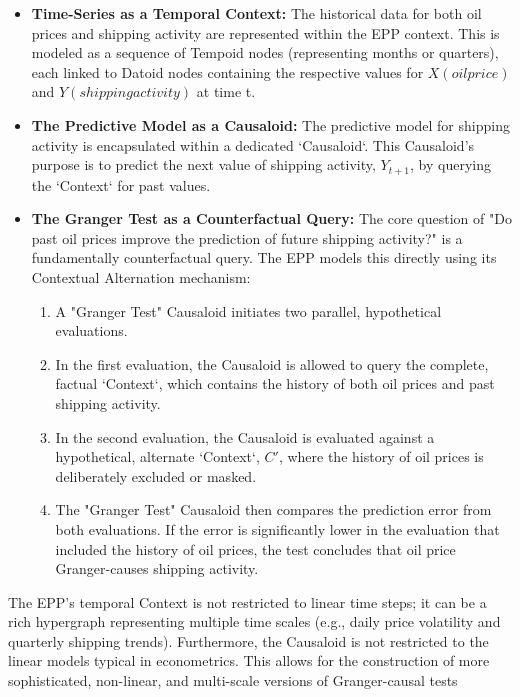 \begin{itemize}
	\item \textbf{Time-Series as a Temporal Context:} The historical data for both oil prices and shipping activity are represented within the EPP context. This is modeled as a sequence of Tempoid nodes (representing months or quarters), each linked to Datoid nodes containing the respective values for $X(oil price)$ and $Y(shipping activity)$ at time t.

	\item \textbf{The Predictive Model as a Causaloid:} The predictive model for shipping activity is encapsulated within a dedicated `Causaloid`. This Causaloid's purpose is to predict the next value of shipping activity, $Y_{t+1}$, by querying the `Context` for past values.

	\item \textbf{The Granger Test as a Counterfactual Query:} The core question of "Do past oil prices improve the prediction of future shipping activity?" is a fundamentally counterfactual query. The EPP models this directly using its Contextual Alternation mechanism:
    \begin{enumerate}
        \item A "Granger Test" Causaloid initiates two parallel, hypothetical evaluations.
        \item In the first evaluation, the Causaloid is allowed to query the complete, factual `Context`, which contains the history of both oil prices and past shipping activity.
        \item In the second evaluation, the Causaloid is evaluated against a hypothetical, alternate `Context`, $C'$, where the history of oil prices is deliberately excluded or masked.
        \item The "Granger Test" Causaloid then compares the prediction error from both evaluations. If the error is significantly lower in the evaluation that included the history of oil prices, the test concludes that oil price Granger-causes shipping activity.
    \end{enumerate}

\end{itemize}

The EPP's temporal Context is not restricted to linear time steps; it can be a rich hypergraph representing multiple time scales (e.g., daily price volatility and quarterly shipping trends). Furthermore, the Causaloid is not restricted to the linear models typical in econometrics. This allows for the construction of more sophisticated, non-linear, and multi-scale versions of Granger-causal tests

